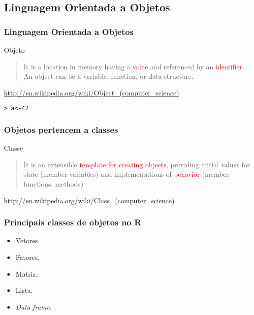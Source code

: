 \documentclass[handout]{beamer}
\begin{document}
\subsection{Linguagem Orientada a Objetos}

\begin{frame}
  \frametitle{Linguagem Orientada a Objetos}
  \begin{block}{Objeto}
    \begin{quote}
      It is a location in memory having a \textcolor{red}{value} and referenced by an \textcolor{red}{identifier}. An object can be a variable, function, or data structure.
      \end{quote}
\url{http://en.wikipedia.org/wiki/Object_(computer_science)} 
\end{block}
\pause
\texttt{> a<-42}
\end{frame}

\begin{frame}
  \frametitle{Objetos pertencem a classes}
  \begin{block}{Classe}
    \begin{quote}
      It is an extensible \textcolor{red}{template for creating
        objects}, providing initial values for state (member
      variables) and implementations of \textcolor{red}{behavior} (member functions, methods)
    \end{quote}
\url{http://en.wikipedia.org/wiki/Class_(computer_science)}

  \end{block}
\end{frame}

\begin{frame}
  \frametitle{Principais classes de objetos no R}
  \begin{itemize}
    \item Vetores.
    \item Fatores.
    \item Matriz.
    \item Lista.
    \item \textit{Data frame}.
    
  \end{itemize}
  \end{frame}
\end{document}
